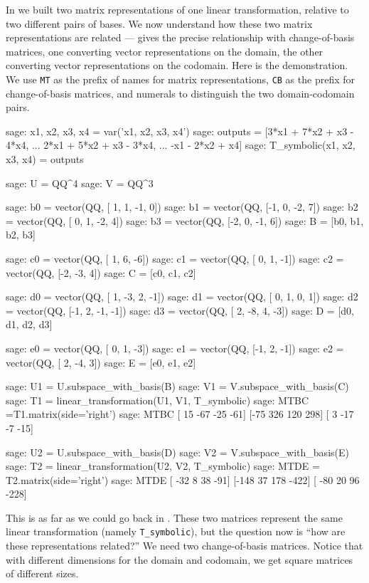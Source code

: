 In  we built two matrix representations of one linear transformation, relative to two different pairs of bases.  We now understand how these two matrix representations are related ---  gives the precise relationship with change-of-basis matrices, one converting vector representations on the domain, the other converting vector representations on the codomain.  Here is the demonstration.  We use \verb?MT? as the prefix of names for matrix representations, \verb?CB? as the prefix for change-of-basis matrices, and numerals to distinguish the two domain-codomain pairs.
%
\begin{sageexample}
sage: x1, x2, x3, x4 = var('x1, x2, x3, x4')
sage: outputs = [3*x1 + 7*x2 + x3 - 4*x4,
...              2*x1 + 5*x2 + x3 - 3*x4,
...               -x1 - 2*x2      +   x4]
sage: T_symbolic(x1, x2, x3, x4) = outputs

sage: U = QQ^4
sage: V = QQ^3

sage: b0 = vector(QQ, [ 1, 1, -1, 0])
sage: b1 = vector(QQ, [-1, 0, -2, 7])
sage: b2 = vector(QQ, [ 0, 1, -2, 4])
sage: b3 = vector(QQ, [-2, 0, -1, 6])
sage: B = [b0, b1, b2, b3]

sage: c0 = vector(QQ, [ 1,  6, -6])
sage: c1 = vector(QQ, [ 0,  1, -1])
sage: c2 = vector(QQ, [-2, -3,  4])
sage: C = [c0, c1, c2]

sage: d0 = vector(QQ, [ 1, -3,  2, -1])
sage: d1 = vector(QQ, [ 0,  1,  0,  1])
sage: d2 = vector(QQ, [-1,  2, -1, -1])
sage: d3 = vector(QQ, [ 2, -8,  4, -3])
sage: D = [d0, d1, d2, d3]

sage: e0 = vector(QQ, [ 0,  1, -3])
sage: e1 = vector(QQ, [-1,  2, -1])
sage: e2 = vector(QQ, [ 2, -4,  3])
sage: E = [e0, e1, e2]

sage: U1 = U.subspace_with_basis(B)
sage: V1 = V.subspace_with_basis(C)
sage: T1 = linear_transformation(U1, V1, T_symbolic)
sage: MTBC =T1.matrix(side='right')
sage: MTBC
[ 15 -67 -25 -61]
[-75 326 120 298]
[  3 -17  -7 -15]

sage: U2 = U.subspace_with_basis(D)
sage: V2 = V.subspace_with_basis(E)
sage: T2 = linear_transformation(U2, V2, T_symbolic)
sage: MTDE = T2.matrix(side='right')
sage: MTDE
[ -32    8   38  -91]
[-148   37  178 -422]
[ -80   20   96 -228]
\end{sageexample}
%
This is as far as we could go back in .  These two matrices represent the same linear transformation (namely \verb?T_symbolic?), but the question now is ``how are these representations related?''  We need two change-of-basis matrices.  Notice that with different dimensions for the domain and codomain, we get square matrices of different sizes.
